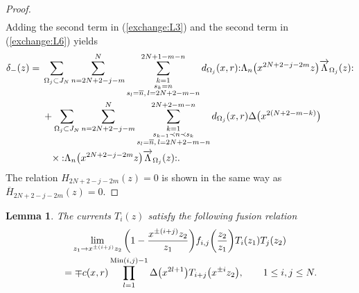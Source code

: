 \documentclass[10pt,a4paper]{amsart}
\numberwithin{equation}{section}
\newtheorem{Lemma}[Theorem]{Lemma}
\begin{document}
\begin{proof}
\begin{align}
\label{def:delta+}
\end{align}
Adding the second term in (\ref{exchange:L3}) and the second term in (\ref{exchange:L6}) yields
\begin{align}
{\delta}_-(z)={}&\sum_{\Omega_j \subset J_N}\sum_{n=2N+2-j-m}^{N}
\sum\limits_{\substack{k=1\\s_k=n
\\s_l=\overline{n},\, l=2N+2-m-n}}^{2N+1-m-n}d_{\Omega_j}(x,r)
{:}\Lambda_{n}\big(x^{2N+2-j-2m}z\big)\overrightarrow{\Lambda}_{\Omega_j}(z){:}\notag
\\
&+\sum_{\Omega_j \subset J_N}\sum_{n=2N+2-j-m}^{N}
\sum\limits_{\substack{k=1\\s_{k-1}\prec n \prec s_k
\\s_l=\overline{n}, \, l=2N+2-m-n}}^{2N+2-m-n}d_{\Omega_j}(x,r)\Delta\big(x^{2(N+2-m-k)}\big) \notag
\\
&\phantom{+}\times{:}\Lambda_{n}\big(x^{2N+2-j-2m}z\big)\overrightarrow{\Lambda}_{\Omega_j}(z){:}.
\label{def:delta-}
\end{align}
The relation $H_{2N+2-j-2m}(z)=0$ is shown in the same way as
$\overline{H}_{2N+2-j-2m}(z)=0$.
\end{proof}

{\samepage\begin{Lemma}
The {currents} $T_i(z)$ satisfy the following fusion relation
\begin{gather}
\lim_{z_1 \to x^{\pm (i+j)}z_2}
\bigg(1-\frac{x^{\pm (i+j)}z_2}{z_1}\bigg)f_{i,j}\bigg(\frac{z_2}{z_1}\bigg)T_i(z_1)T_j(z_2)\notag
\\ \qquad
{}=\mp c(x,r)\prod_{l=1}^{\operatorname{Min}(i,j)-1}\Delta\big(x^{2l+1}\big)T_{i+j}\big(x^{\pm i}z_2\big),\qquad
1\leq i, j \leq N.
\label{eqn:fusion-T1}
\end{gather}
\end{Lemma}}
\end{document}
